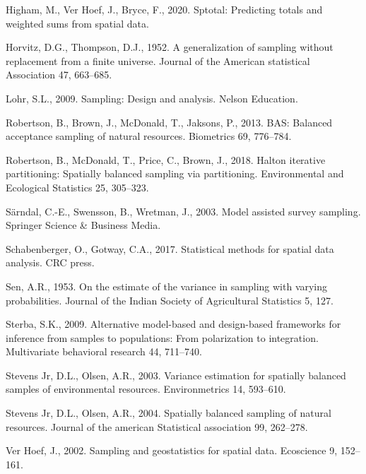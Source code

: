 \documentclass[]{elsarticle} %
\begin{document}
\leavevmode\hypertarget{ref-higham2020sptotal}{}%
Higham, M., Ver Hoef, J., Bryce, F., 2020. Sptotal: Predicting totals
and weighted sums from spatial data.

\leavevmode\hypertarget{ref-horvitz1952generalization}{}%
Horvitz, D.G., Thompson, D.J., 1952. A generalization of sampling
without replacement from a finite universe. Journal of the American
statistical Association 47, 663--685.

\leavevmode\hypertarget{ref-lohr2009sampling}{}%
Lohr, S.L., 2009. Sampling: Design and analysis. Nelson Education.

\leavevmode\hypertarget{ref-robertson2013bas}{}%
Robertson, B., Brown, J., McDonald, T., Jaksons, P., 2013. BAS: Balanced
acceptance sampling of natural resources. Biometrics 69, 776--784.

\leavevmode\hypertarget{ref-robertson2018halton}{}%
Robertson, B., McDonald, T., Price, C., Brown, J., 2018. Halton
iterative partitioning: Spatially balanced sampling via partitioning.
Environmental and Ecological Statistics 25, 305--323.

\leavevmode\hypertarget{ref-sarndal2003model}{}%
Särndal, C.-E., Swensson, B., Wretman, J., 2003. Model assisted survey
sampling. Springer Science \& Business Media.

\leavevmode\hypertarget{ref-schabenberger2017statistical}{}%
Schabenberger, O., Gotway, C.A., 2017. Statistical methods for spatial
data analysis. CRC press.

\leavevmode\hypertarget{ref-sen1953estimate}{}%
Sen, A.R., 1953. On the estimate of the variance in sampling with
varying probabilities. Journal of the Indian Society of Agricultural
Statistics 5, 127.

\leavevmode\hypertarget{ref-sterba2009alternative}{}%
Sterba, S.K., 2009. Alternative model-based and design-based frameworks
for inference from samples to populations: From polarization to
integration. Multivariate behavioral research 44, 711--740.

\leavevmode\hypertarget{ref-stevens2003variance}{}%
Stevens Jr, D.L., Olsen, A.R., 2003. Variance estimation for spatially
balanced samples of environmental resources. Environmetrics 14,
593--610.

\leavevmode\hypertarget{ref-stevens2004spatially}{}%
Stevens Jr, D.L., Olsen, A.R., 2004. Spatially balanced sampling of
natural resources. Journal of the american Statistical association 99,
262--278.

\leavevmode\hypertarget{ref-verhoef2002sampling}{}%
Ver Hoef, J., 2002. Sampling and geostatistics for spatial data.
Ecoscience 9, 152--161.
\end{document}
